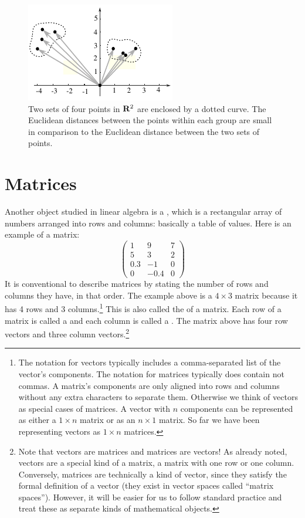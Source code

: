 \begin{figure}[h]
\centering
\includegraphics[scale=1.55]{./images/Nearfar.pdf}
\caption{Two sets of four points in ${\bf R}^2$ are enclosed by a dotted curve.  
The Euclidean distances between the points within each group are small in 
comparison to the Euclidean distance between the two sets of points.}
\label{nearfar}
\end{figure}

\section{Matrices}\label{sect_matrices}


   Another object studied in linear algebra is a , which is a 
rectangular array of numbers arranged into rows and columns: basically a table of 
values. Here is an example of a matrix:
\[
\begin{pmatrix}
 1  &   9  & 7 \\
 5  &   3  & 2 \\
0.3 &  -1  & 0 \\
 0  & -0.4 & 0
\end{pmatrix}
\]
It is conventional to describe matrices by stating the number of rows and 
columns they have, in that order. The example above is a $4 \times 3$ 
matrix because it has 4 rows and 3 columns.\footnote{The notation for vectors typically includes a comma-separated list of the vector's components. The notation for matrices typically does contain not commas. A  matrix's components are only aligned into rows and columns without any extra characters to separate them. Otherwise we think of vectors as special cases of matrices. A vector with $n$ components can be represented as either a $1 \times n$ matrix or as an $n \times 1$ matrix. So far we have been representing vectors as $1 \times n$ matrices.} This is also called the  of a matrix.  Each row of a matrix is called a  and each column is called a . The matrix above has four row vectors and 
three column vectors.\footnote{Note that vectors  are matrices and matrices are vectors!  As already noted, vectors are a special kind of a matrix, 
a matrix with one row or one column. Conversely, matrices are technically a 
kind of vector, since they satisfy the formal definition of a vector (they 
exist in vector spaces called ``matrix spaces''). However, it will be easier for us to follow standard practice and treat these as separate kinds of mathematical objects.}  

